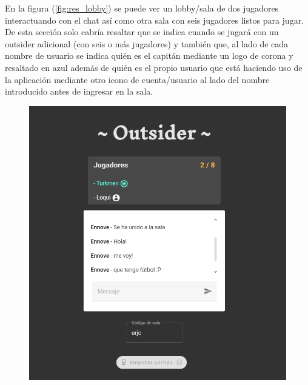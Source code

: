 En la figura (\ref{fig:res_lobby}) se puede ver un lobby/sala de dos jugadores interactuando con el chat así como otra sala con seis jugadores listos para jugar. De esta sección solo
cabría resaltar que se indica cuando se jugará con un outsider adicional (con seis o más jugadores) y también que, al lado de cada nombre de usuario se indica quién es el capitán mediante
un logo de corona y resaltado en azul además de quién es el propio usuario que está haciendo uso de la aplicación mediante otro icono de cuenta/usuario al lado del nombre introducido
antes de ingresar en la sala.

\begin{figure}[h]
   \centering
   \begin{minipage}{0.45\textwidth}
	\centering
	  \includegraphics[clip=true,width=\textwidth]{res_lobby2.png}\\
   \end{minipage}
   \hfill
   \begin{minipage}{0.45\textwidth}
	\centering

\end{minipage}
\end{figure}
